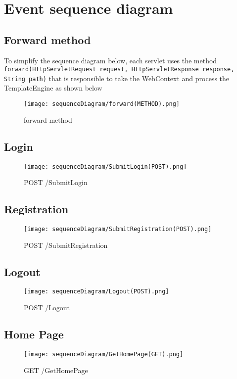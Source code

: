 \documentclass{article}
\begin{document}
\newpage
\section{Event sequence diagram}

\subsection{Forward method}
To simplify the sequence diagram below, each servlet uses the method
\texttt{forward(HttpServletRequest request, HttpServletResponse response, String path)} that is responsible to take the WebContext and process the TemplateEngine as shown below

\begin{figure}[h]
\centering
\texttt{[image: sequenceDiagram/forward(METHOD).png]}
\caption{forward method}
\label{fig:ForwardMethod}
\end{figure}

\newpage
\subsection{Login}
\begin{figure}[h]
\centering
\texttt{[image: sequenceDiagram/SubmitLogin(POST).png]}
\caption{POST /SubmitLogin}
\label{fig:SubmitLogin}
\end{figure}

\newpage
\subsection{Registration}
\begin{figure}[h]
\centering
\texttt{[image: sequenceDiagram/SubmitRegistration(POST).png]}
\caption{POST /SubmitRegistration}
\label{fig:SubmitRegistration}
\end{figure}

\newpage
\subsection{Logout}
\begin{figure}[h]
\centering
\texttt{[image: sequenceDiagram/Logout(POST).png]}
\caption{POST /Logout}
\label{fig:Logout}
\end{figure}

\newpage
\subsection{Home Page}
\begin{figure}[h]
\centering
\texttt{[image: sequenceDiagram/GetHomePage(GET).png]}
\caption{GET /GetHomePage}
\label{fig:GetHomePage}
\end{figure}
\end{document}

